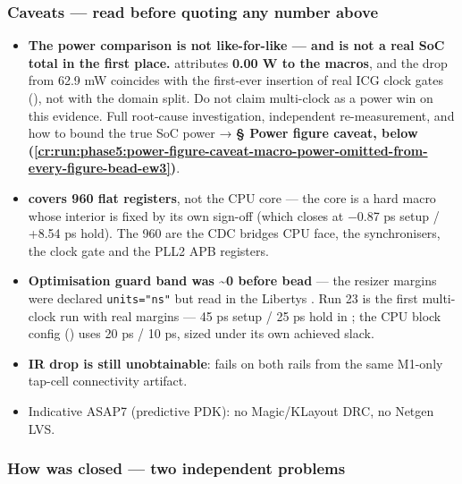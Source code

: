 \subsubsection{Caveats --- read before quoting any number above}\label{cr:run:phase5:caveats-read-before-quoting-any-number-above}

\begin{record}

\begin{itemize}
\tightlist
\item
  \textbf{The power comparison is not like-for-like --- and is not a
  real SoC total in the first place.}  attributes
  \textbf{0.00 W to the macros}, and the drop from 62.9 mW coincides
  with the first-ever insertion of real ICG clock gates
  (), not with the domain split. Do not claim
  multi-clock as a power win on this evidence. Full root-cause
  investigation, independent re-measurement, and how to bound the true
  SoC power → \textbf{§ Power figure caveat,
  below (\cref{cr:run:phase5:power-figure-caveat-macro-power-omitted-from-every-figure-bead-ew3})}.
\item
  \textbf{ covers 960 flat registers}, not the CPU core
  --- the core is a hard macro whose interior is fixed by its own
  sign-off (which closes at −0.87 ps setup / +8.54 ps hold). The 960 are
  the CDC bridge\textquotesingle s CPU face, the synchronisers, the
  clock gate and the PLL2 APB registers.
\item
  \textbf{Optimisation guard band was \textasciitilde0 before bead
  } --- the resizer margins were declared
  \texttt{units=\allowbreak{}"ns"} but read in the
  Liberty\textquotesingle s . Run 23 is the first multi-clock
  run with real margins --- 45 ps setup / 25 ps hold in
  ; the CPU block config
  () uses 20 ps / 10 ps, sized under its
  own achieved slack.
\item
  \textbf{IR drop is still unobtainable}: 
  fails  on both rails from the same M1-only tap-cell
  connectivity artifact.
\item
  Indicative ASAP7 (predictive PDK): no Magic/\allowbreak{}KLayout DRC,
  no Netgen LVS.
\end{itemize}

\end{record}

\subsubsection{\texorpdfstring{How  was closed --- two
independent problems}{How  was closed --- two independent problems}}\label{cr:run:phase5:how-cpu-clk-was-closed-two-independent-problems}

